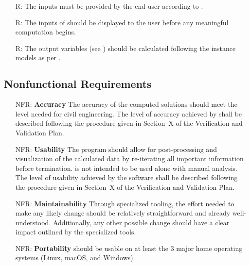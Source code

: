 \documentclass[12pt]{article}
\newcounter{reqnum} %
\newcounter{nfrnum} %
\begin{document}
\noindent
\begin{itemize}

    \item[R\refstepcounter{reqnum}\thereqnum \label{R_Inputs}:] The inputs must
        be provided by the end-user according to .

    \item[R\refstepcounter{reqnum}\thereqnum \label{R_OutputInputs}:] The inputs
        of \progname{} should be displayed to the user before any meaningful
        computation begins.

    \item[R\refstepcounter{reqnum}\thereqnum \label{R_Calculate}:] The output
        variables (see ) should be calculated following the
        instance models as per .

\end{itemize}

\subsection{Nonfunctional Requirements}

\noindent\begin{itemize}

    \item[NFR\refstepcounter{nfrnum}\thenfrnum \label{NFR_Accuracy}:]
        \textbf{Accuracy} The accuracy of the computed solutions should meet the
        level needed for civil engineering.  The level of accuracy achieved by
        \progname{} shall be described following the procedure given in
        Section~X of the Verification and Validation
        Plan.

    \item[NFR\refstepcounter{nfrnum}\thenfrnum \label{NFR_Usability}:]
        \textbf{Usability} The program should allow for post-processing and
        visualization of the calculated data by re-iterating all important
        information before termination. \progname{} is not intended to be used
        alone with manual analysis. The level of usability achieved by the
        software shall be described following the procedure given in
        Section~X of the Verification and Validation
        Plan.

    \item[NFR\refstepcounter{nfrnum}\thenfrnum \label{NFR_Maintainability}:]
        \textbf{Maintainability} Through specialized tooling, the effort needed
        to make any likely change should be relatively straightforward and
        already well-understood. Additionally, any other possible change should
        have a clear impact outlined by the specialized tools.

    \item[NFR\refstepcounter{nfrnum}\thenfrnum \label{NFR_Portability}:]
        \textbf{Portability} \progname{} should be usable on at least the 3
        major home operating systems (Linux, macOS, and Windows).

\end{itemize}
\end{document}

